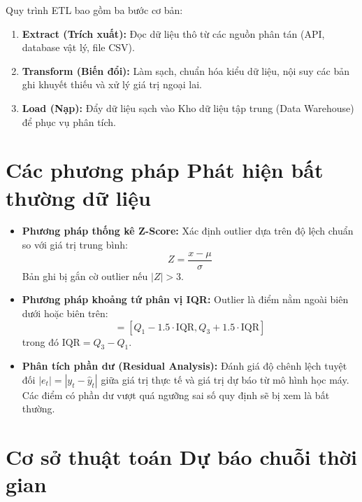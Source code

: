\documentclass[12pt, a4paper]{report}
\begin{document}
Quy trình ETL bao gồm ba bước cơ bản:
\begin{enumerate}[noitemsep]
    \item \textbf{Extract (Trích xuất):} Đọc dữ liệu thô từ các nguồn phân tán (API, database vật lý, file CSV).
    \item \textbf{Transform (Biến đổi):} Làm sạch, chuẩn hóa kiểu dữ liệu, nội suy các bản ghi khuyết thiếu và xử lý giá trị ngoại lai.
    \item \textbf{Load (Nạp):} Đẩy dữ liệu sạch vào Kho dữ liệu tập trung (Data Warehouse) để phục vụ phân tích.
\end{enumerate}

\section{Các phương pháp Phát hiện bất thường dữ liệu}
\label{sec:anomaly_theory}

\begin{itemize}[noitemsep]
    \item \textbf{Phương pháp thống kê Z-Score:} Xác định outlier dựa trên độ lệch chuẩn so với giá trị trung bình:
    \begin{equation}
        Z = \frac{x - \mu}{\sigma}
    \end{equation}
    Bản ghi bị gắn cờ outlier nếu $|Z| > 3$.
    \item \textbf{Phương pháp khoảng tứ phân vị IQR:} Outlier là điểm nằm ngoài biên dưới hoặc biên trên:
    \begin{equation}
        [\text{Lower Bound}, \text{Upper Bound}] = [Q_1 - 1.5 \cdot \text{IQR}, Q_3 + 1.5 \cdot \text{IQR}]
    \end{equation}
    trong đó $\text{IQR} = Q_3 - Q_1$.
    \item \textbf{Phân tích phần dư (Residual Analysis):} Đánh giá độ chênh lệch tuyệt đối $|e_t| = |y_t - \hat{y}_t|$ giữa giá trị thực tế và giá trị dự báo từ mô hình học máy. Các điểm có phần dư vượt quá ngưỡng sai số quy định sẽ bị xem là bất thường.
\end{itemize}

\section{Cơ sở thuật toán Dự báo chuỗi thời gian}
\label{sec:forecast_theory}
\end{document}
